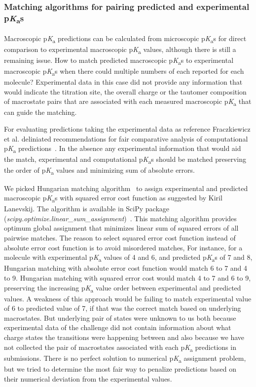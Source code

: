 \documentclass[9pt,lineno,final]{elife}
\newcommand{\pKa}{p\textit{K}\textsubscript{a}}
\begin{document}
\subsubsection{Matching algorithms for pairing predicted and experimental \pKa{}s}

Macroscopic \pKa{} predictions can be calculated from microscopic \pKa{}s for direct comparison to experimental macroscopic \pKa{} values, although there is still a remaining issue. 
How to match predicted macroscopic \pKa{}s to experimental macroscopic \pKa{}s when there could multiple numbers of each reported for each molecule? 
Experimental data in this case did not provide any information that would indicate the titration site, the overall charge or the tautomer composition of macrostate pairs that are associated with each measured macroscopic \pKa{} that can guide the matching.

For evaluating predictions taking the experimental data as reference Fraczkiewicz et al. deliniated recommendations for fair comparative analysis of computational \pKa{} predictions~\citep{Fraczkiewicz:2013:ReferenceModuleinChemistryMolecularSciencesandChemicalEngineering}. 
In the absence any experimental information that would aid the match, experimental and computational \pKa{}s should be matched preserving the order of \pKa{} values and minimizing sum of absolute errors.

We picked Hungarian matching algorithm~\citep{Kuhn:1955:Nav.Res.Logist.Q., Munkres:1957:JSIAM} to assign experimental and predicted macroscopic \pKa{}s with squared error cost function  as suggested by Kiril Lanevskij. The algorithm is available in SciPy package (\textit{scipy.optimize.linear\_sum\_assignment})~\citep{SciPy-linear-sum-assignment}.
This matching algorithm provides optimum global assignment that minimizes linear sum of squared errors of all pairwise matches.
The reason to select squared error cost function instead of absolute error cost function is to avoid misordered matches,
For instance, for a molecule with experimental \pKa{} values of 4 and 6, and predicted \pKa{}s of 7 and 8, Hungarian matching with absolute error cost function would match 6 to 7 and 4 to 9.
Hungarian matching with squared error cost would match 4 to 7 and 6 to 9, preserving the increasing \pKa{} value order between experimental and predicted values.
A weakness of this approach would be failing to match experimental value of 6 to predicted value of 7, if that was the correct match based on underlying macrostates. But underlying pair of states were unknown to us both because experimental data of the challenge did not contain information about what charge states the transitions were happening between and also because we have not collected the pair of macrostates associated with each \pKa{} predictions in submissions. 
There is no perfect solution to numerical \pKa{} assignment problem, but we tried to determine the most fair way to penalize predictions based on their numerical deviation from the experimental values.
\end{document}
